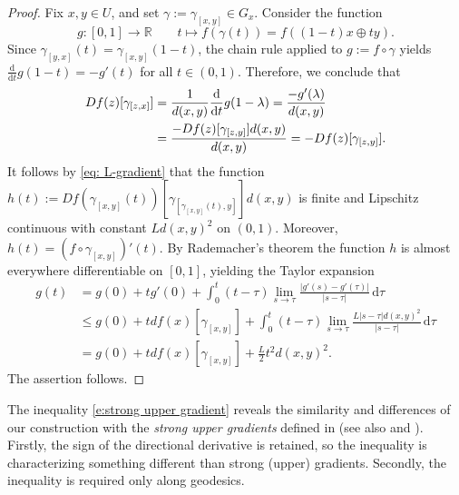 \documentclass{article}
\theoremstyle{plain}\newtheorem{theorem}{Theorem}[section]
\theoremstyle{plain}\newtheorem{definition}[theorem]{Definition}
\theoremstyle{plain}\newtheorem{lemma}[theorem]{Lemma}
\theoremstyle{definition}\newtheorem{remark}[theorem]{Remark}
\theoremstyle{definition}\newtheorem{example}[theorem]{Example}
\theoremstyle{plain}\newtheorem{proposition}[theorem]{Proposition}
\theoremstyle{plain}\newtheorem{inference}[theorem]{Inference}
\theoremstyle{plain}\newtheorem{corollary}[theorem]{Corollary}
\theoremstyle{plain}\newtheorem{assumption}[theorem]{Assumption}
\begin{document}
\begin{proof}
    Fix $x, y\in U$, and set $\gamma:=\gamma_{[x,y]}\in G_x$. Consider the function
    $$
    g:[0,1]\to\mathbb{R} \qquad t\mapsto f(\gamma(t))=f((1-t)x\oplus ty).
    $$
    Since $\gamma_{[y,x]}(t)=\gamma_{[x,y]}(1-t)$, the chain rule applied to $g:=f\circ\gamma$ yields $\frac{\mathrm{d}}{\mathrm{d}t}g(1-t)=-g'(t)$ for all $t\in(0,1)$. Therefore, we conclude that
    \begin{align}
        Df(z)[\gamma_{[z,x]}]&=\frac{1}{d(x,y)}\frac{\mathrm{d}}{\mathrm{d}t}g(1-\lambda)=\frac{-g'(\lambda)}{d(x,y)}\notag\\
        &=\frac{-Df(z)[\gamma_{[z,y]}]d(x,y)}{d(x,y)}=-Df(z)[\gamma_{[z,y]}].\label{eq: dir grad inv dir}
    \end{align}
    It follows by \eqref{eq: L-gradient} that the function $h(t):=Df(\gamma_{[x,y]}(t))[\gamma_{[\gamma_{[x,y]}(t),y]}]d(x,y)$ is finite and Lipschitz continuous with constant $Ld(x,y)^2$ on $(0,1)$. Moreover, $h(t)=(f\circ\gamma_{[x,y]})'(t)$. By Rademacher's theorem \cite{Rademacher1917} the function $h$ is almost everywhere differentiable on $[0,1]$, yielding the Taylor expansion
    \begin{equation}\label{e:strong upper gradient}
        \begin{aligned}
            g(t)&=g(0)+tg'(0)+\int_0^t(t-\tau)\lim_{s\to\tau}\frac{\bigl|g'(s)-g'(\tau)\bigr|}{|s-\tau|}\,\mathrm{d}\tau\\
            &\leq g(0)+tdf(x)[\gamma_{[x,y]}]+\int_0^t(t-\tau)\lim_{s\to\tau}\frac{L|s-\tau|d(x,y)^2}{|s-\tau|}\,\mathrm{d}\tau\\
            &=g(0)+tdf(x)[\gamma_{[x,y]}]+\frac{L}{2}t^2d(x,y)^2.
        \end{aligned}     
    \end{equation}
    The assertion follows.
\end{proof}
The inequality \eqref{e:strong upper gradient} reveals the similarity and differences of our construction with the {\em strong upper gradients} defined in \cite[Definition 1.2.1]{AmbGigSav2005} (see also \cite[Eq.(2)]{Haj94} and \cite[Eq.(2.10)]{HeiKos98}). Firstly, the sign of the directional derivative is retained, so the inequality is characterizing something different than strong (upper) gradients. Secondly, the inequality is required only along geodesics.
\end{document}
